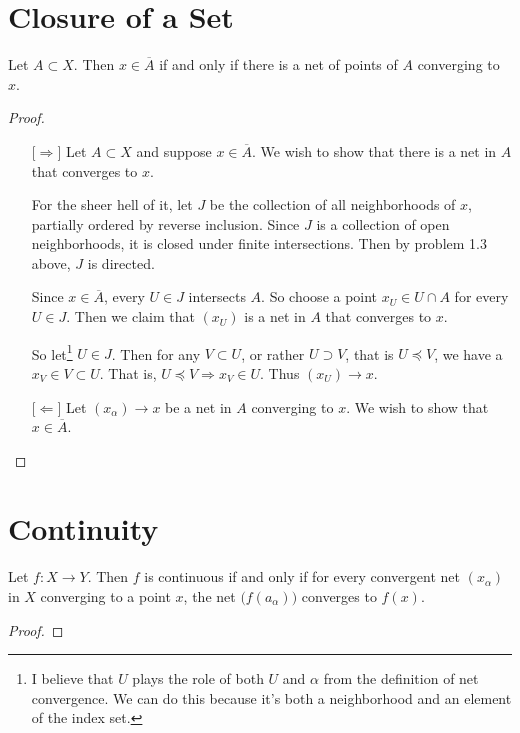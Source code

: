 \documentclass[12pt]{article}
\begin{document}
\section{Closure of a Set}
\begin{thm}
    Let $A \subset X$. Then $x \in \overline A$ if and only if there is a net of points of $A$
    converging to $x$.
\end{thm}
\begin{proof}
    \ \vspace{-0.5cm}\newline
    \begin{itemize}
        \item[$\lbrack\Rightarrow\rbrack$] Let $A \subset X$ and suppose $x \in \overline A$. We
              wish to show that there is a net in $A$ that converges to $x$.

              For the sheer hell of it, let $J$ be the collection of all neighborhoods of $x$,
              partially ordered by reverse inclusion. Since $J$ is a collection of open
              neighborhoods, it is closed under finite intersections. Then by problem 1.3 above,
              $J$ is directed.

              Since $x \in \overline A$, every $U \in J$ intersects $A$. So choose a point
              $x_U \in U \cap A$ for every $U \in J$. Then we claim that $(x_U)$ is a net in
              $A$ that converges to $x$.

              So let\footnote{I believe\texttrademark{} that $U$ plays the role of
                  both $U$ and $\alpha$ from the definition of net convergence. We can do this
                  because it's both a neighborhood and an element of the index set.}
              $U \in J$. Then for any $V \subset U$, or rather $U \supset V$, that is
              $U \preceq V$, we have a $x_V \in V \subset U$. That is,
              $U \preceq V \Rightarrow x_V \in U$. Thus $(x_U) \to x$.
        \item[$\lbrack\Leftarrow\rbrack$] Let $(x_\alpha) \to x$ be a net in $A$ converging to $x$.
              We wish to show that $x \in \overline A$.
    \end{itemize}

\end{proof}

\section{Continuity}
\begin{thm}
    Let $f: X \to Y$. Then $f$ is continuous if and only if for every convergent net $(x_\alpha)$
    in $X$ converging to a point $x$, the net $\big(f(a_\alpha)\big)$ converges to $f(x)$.
\end{thm}
\begin{proof}
\end{proof}
\end{document}
